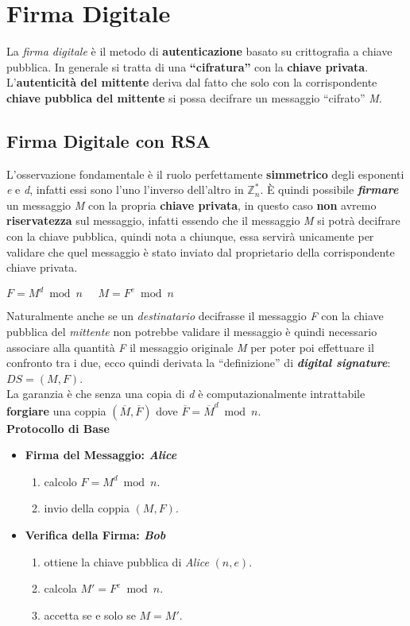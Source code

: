 \chapter{Firma Digitale}
La \textit{firma digitale} è il metodo di \textbf{autenticazione} basato su crittografia a chiave pubblica. In generale si tratta di una \textbf{``cifratura''} con la \textbf{chiave privata}. L'\textbf{autenticità del mittente} deriva dal fatto che solo con la corrispondente \textbf{chiave pubblica del mittente} si possa decifrare un messaggio ``cifrato'' \textit{M}.

\section{Firma Digitale con RSA}
L'osservazione fondamentale è il ruolo perfettamente \textbf{simmetrico} degli esponenti \textit{e} e \textit{d}, infatti essi sono l'uno l'inverso dell'altro in $\mathbb{Z}_n^*$. È quindi possibile \textbf{\textit{firmare}} un messaggio \textit{M} con la propria \textbf{chiave privata}, in questo caso \textbf{non} avremo \textbf{riservatezza} sul messaggio, infatti essendo che il messaggio \textit{M} si potrà decifrare con la chiave pubblica, quindi nota a chiunque, essa servirà unicamente per validare che quel messaggio è stato inviato dal proprietario della corrispondente chiave privata.
\begin{center}
    $F = M^d \bmod n \;\;\;\;\; M = F^e \bmod n$
\end{center}
Naturalmente anche se un \textit{destinatario} decifrasse il messaggio \textit{F} con la chiave pubblica del \textit{mittente} non potrebbe validare il messaggio è quindi necessario associare alla quantità \textit{F} il messaggio originale \textit{M} per poter poi effettuare il confronto tra i due, ecco quindi derivata la ``definizione'' di \textbf{\textit{digital signature}}: $DS = (M, F)$. \\
La garanzia è che senza una copia di \textit{d} è computazionalmente intrattabile \textbf{forgiare} una coppia $(\overline{M}, \overline{F})$ dove $\overline{F} = \overline{M}^d \bmod n$.
\\ \newline
\textbf{Protocollo di Base}
\begin{itemize}
    \item \textbf{Firma del Messaggio: \textit{Alice}}
    \begin{enumerate}
        \item calcolo $F = M^d \bmod n$.
        \item invio della coppia $(M, F)$.
    \end{enumerate}
    \item \textbf{Verifica della Firma: \textit{Bob}}
    \begin{enumerate}
        \item ottiene la chiave pubblica di \textit{Alice} $(n, e)$.
        \item calcola $M' = F^e \bmod n$.
        \item accetta se e solo se $M = M'$.
    \end{enumerate}
\end{itemize}
